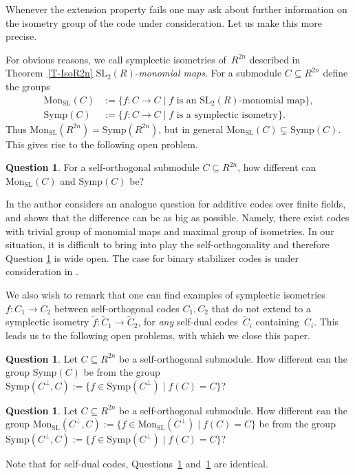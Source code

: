 \documentclass[11pt]{article}
\theoremstyle{definition}
\newtheorem{question}[theo]{Question}
\numberwithin{equation}{section}
\newcommand{\SL}{\mathrm{SL}}
\newcommand{\Symp}{\mathrm{Symp}}
\newcommand{\MonSL}{\mbox{$\mathrm{Mon}_{\mathrm{SL}}$}}
\newcounter{rom}
\begin{document}

Whenever the extension property fails one may ask about further information on the isometry group of the code under
consideration.
Let us make this more precise.

For obvious reasons, we call symplectic isometries of~$R^{2n}$  described in Theorem~\ref{T-IsoR2n} $\SL_2(R)$-\emph{monomial maps}.
For a submodule $C\subseteq R^{2n}$ define the groups
\begin{align*}
   \MonSL(C)&:=\{f:C\longrightarrow C\mid f\text{ is an $\SL_2(R)$-monomial map} \},\\
   \Symp(C)&:=\{f:C\longrightarrow C\mid f\text{ is a symplectic isometry}\}.
\end{align*}
Thus $\MonSL(R^{2n})=\Symp(R^{2n})$, but in general $\MonSL(C)\subsetneq\Symp(C)$.
This gives rise to the following open problem.

\begin{question}\label{Q1}
For a self-orthogonal submodule $C\subseteq R^{2n}$, how different can $\MonSL(C)$ and $\Symp(C)$ be?
\end{question}

In \cite{Wo16} the author considers an analogue question for additive codes over finite fields, and shows that the difference can be as big as possible. Namely, there exist codes with trivial group of monomial maps and maximal group of isometries.
In our situation, it is difficult to bring into play the self-orthogonality and therefore Question \ref{Q1} is wide open. The case for binary stabilizer codes is under consideration in \cite{Pl17}.

We also wish to remark that one can find examples of symplectic isometries $f:C_1\rightarrow C_2$ between self-orthogonal codes $C_1,C_2$ that do not extend to a symplectic isometry
$\tilde{f}:\tilde{C}_1\rightarrow\tilde{C}_2$, for \emph{any}  self-dual codes~$\tilde{C}_i$ containing~$C_i$.
This leads us to the following open problems, with which we close this paper.

\begin{question}\label{Q2}
Let $C\subseteq R^{2n}$ be a self-orthogonal submodule. How different can the group $\Symp(C)$  be from the group
$\Symp(C^\perp,C):=\{f\in\Symp(C^\perp)\mid f(C)=C\}$?
\end{question}


\begin{question}\label{Q3}
Let $C\subseteq R^{2n}$ be a self-orthogonal submodule. How different can the group $\MonSL(C^{\perp},C) := \{f \in \MonSL(C^{\perp}) \mid f(C) = C\}$  be from the group
$\Symp(C^\perp,C):=\{f\in\Symp(C^\perp)\mid f(C)=C\}$?
\end{question}

Note that for self-dual codes, Questions~\ref{Q3} and~\ref{Q1} are identical.



\end{document}
